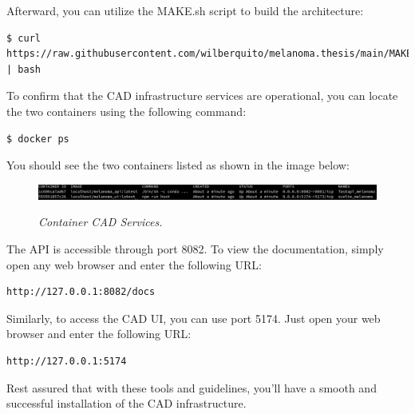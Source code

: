 Afterward, you can utilize the MAKE.sh script to build the architecture:

\begin{Verbatim}[fontsize=\scriptsize]
$ curl https://raw.githubusercontent.com/wilberquito/melanoma.thesis/main/MAKE.sh | bash
\end{Verbatim}

To confirm that the CAD infrastructure services are operational,
you can locate the two containers using the following command:

\begin{Verbatim}[fontsize=\scriptsize]
$ docker ps
\end{Verbatim}

You should see the two containers listed as shown in the image below:

\begin{figure}[H]
\centering
\includegraphics[width=\textwidth]{imatges/appendices/services.png}
\caption[Container CAD Services]{\textit{Container CAD Services.}}
{\label{fig:polling-layer}}
\end{figure}

The API is accessible through port 8082. To view the documentation, simply open any web browser and enter the following URL:

\begin{Verbatim}[fontsize=\scriptsize]
http://127.0.0.1:8082/docs
\end{Verbatim}

Similarly, to access the CAD UI, you can use port 5174. Just open your web browser and enter the following URL:

\begin{Verbatim}[fontsize=\scriptsize]
http://127.0.0.1:5174
\end{Verbatim}

Rest assured that with these tools and guidelines,
you'll have a smooth and successful installation of the CAD infrastructure.
